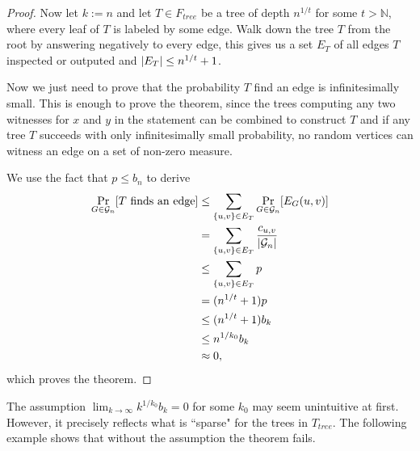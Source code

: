 \begin{proof}
Now let $k:=n$ and let $T\in F_{tree}$ be a tree of depth $n^{1/t}$ for some $t>\mathbb{N}$, where every leaf of $T$ is labeled by some edge. Walk down the tree $T$ from the root by answering negatively to every edge, this gives us a set $E_T$ of all edges $T$ inspected or outputed and $\left|{E_T}\right|\leq n^{1/t}+1$.

Now we just need to prove that the probability $T$ find an edge is infinitesimally small. This is enough to prove the theorem, since the trees computing any two witnesses for $x$ and $y$ in the statement can be combined to construct $T$ and if any tree $T$ succeeds with only infinitesimally small probability, no random vertices can witness an edge on a set of non-zero measure.

We use the fact that $p\leq b_n$ to derive 
\begin{align}
\Pr_{G\in\mathcal{G}_n}[T\text{ finds an edge}]&\leq \sum_{\{u,v\}\in E_T} \Pr_{G\in \mathcal{G}_n}[E_G(u,v)]\\
&=\sum_{\{u,v\}\in E_T} \frac{c_{u,v}}{\left|{\mathcal{G}_n}\right|}\\
&\leq\sum_{\{u,v\}\in E_T} p\\
&=(n^{1/t}+1)p\\
&\leq(n^{1/t}+1)b_k\\
&\leq n^{1/k_0}b_k\\
&\approx 0,
\end{align}
which proves the theorem.
\end{proof}

The assumption $\lim_{k\to \infty} k^{1/k_0}b_k=0$ for some $k_0$ may seem unintuitive at first. However, it precisely reflects what is ``sparse" for the trees in $T_{tree}$. The following example shows that without the assumption the theorem fails.

